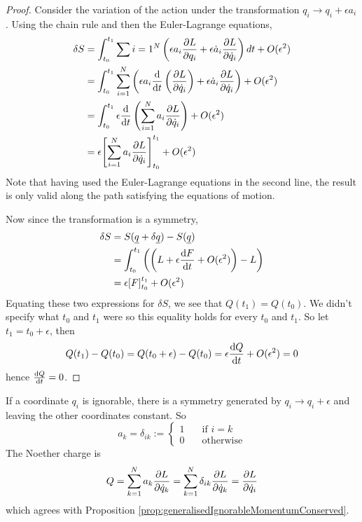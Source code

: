 \begin{proof}
	Consider the variation of the action under the transformation $q_i \rightarrow q_i + \epsilon a_i$. Using the chain rule and then the Euler-Lagrange equations,
	\[
		\begin{aligned}
			\delta S
				& = \int_{t_0}^{t_1} \sum{i = 1}^N \left( \epsilon a_i \diffp{L}{q_i} + \epsilon \dot{a}_i \diffp{L}{\dot{q}_i} \right) dt + O(\epsilon^2) \\
				& = \int_{t_0}^{t_1} \sum_{i = 1}^N \left( \epsilon a_i \diff{}{t} \left( \diffp{L}{\dot{q}_i} \right) + \epsilon \dot{a}_i \diffp{L}{\dot{q}_i} \right) + O(\epsilon^2) \\
				& = \int_{t_0}^{t_1} \epsilon \diff{}{t} \left( \sum_{i = 1}^N a_i \diffp{L}{\dot{q}_i} \right) + O(\epsilon^2) \\
				& = \epsilon {\left[ \sum_{i = 1}^N a_i \diffp{L}{\dot{q}_i} \right]}_{t_0}^{t_1} + O(\epsilon^2)
		\end{aligned}
	\]
	Note that having used the Euler-Lagrange equations in the second line, the result is only valid along the path satisfying the equations of motion.

	Now since the transformation is a symmetry,
	\[
		\begin{aligned}
			\delta S
				& = S(\underline{q} + \delta \underline{q}) - S(\underline{q}) \\
				& = \int_{t_0}^{t_1} \left( \left( L + \epsilon \diff{F}{t} + O(\epsilon^2) \right) - L \right) \\
				& = \epsilon {[F]}_{t_0}^{t_1} + O(\epsilon^2)
		\end{aligned}
	\]
	Equating these two expressions for $\delta S$, we see that $Q(t_1) = Q(t_0)$. We didn't specify what $t_0$ and $t_1$ were so this equality holds for every $t_0$ and $t_1$. So let $t_1 = t_0 + \epsilon$, then
	\[
		Q(t_1) - Q(t_0) = Q(t_0 + \epsilon) - Q(t_0) = \epsilon \diff{Q}{t} + O(\epsilon^2) = 0
	\]
	hence $\diff{Q}{t} = 0$.
\end{proof}

\begin{example}
	If a coordinate $q_i$ is ignorable, there is a symmetry generated by $q_i \rightarrow q_i + \epsilon$ and leaving the other coordinates constant. So
	\[
		a_k = \delta_{ik} := \begin{cases}
			1 & \quad \text{if } i = k \\
			0 & \quad \text{otherwise}
		\end{cases}
	\]
	The Noether charge is
	\[
		Q = \sum_{k = 1}^{N} a_k \diffp{L}{\dot{q}_k} = \sum_{k = 1}^{N} \delta_{ik} \diffp{L}{\dot{q}_k} = \diffp{L}{\dot{q}_i}
	\]
	which agrees with Proposition \ref{prop:generalisedIgnorableMomentumConserved}.
\end{example}

